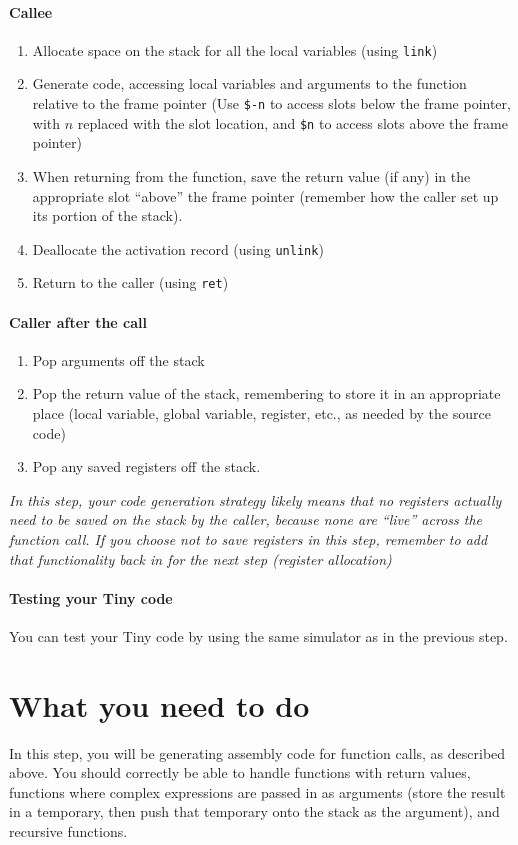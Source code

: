 \documentclass{article}
\begin{document}
\paragraph{Callee}
\begin{enumerate}
	\item Allocate space on the stack for all the local variables (using \texttt{link})
	\item Generate code, accessing local variables and arguments to the function relative to the frame pointer (Use \texttt{\$-n} to access slots below the frame pointer, with $n$ replaced with the slot location, and \texttt{\$n} to access slots above the frame pointer)
	\item When returning from the function, save the return value (if any) in the appropriate slot ``above'' the frame pointer (remember how the caller set up its portion of the stack).
	\item Deallocate the activation record (using \texttt{unlink})
	\item Return to the caller (using \texttt{ret})
\end{enumerate}

\paragraph{Caller after the call}
\begin{enumerate}
	\item Pop arguments off the stack
	\item Pop the return value of the stack, remembering to store it in an appropriate place (local variable, global variable, register, etc., as needed by the source code)
	\item Pop any saved registers off the stack.
\end{enumerate}

{\em In this step, your code generation strategy likely means that no registers actually need to be saved on the stack by the caller, because none are ``live'' across the function call. If you choose not to save registers in this step, remember to add that functionality back in for the next step (register allocation) }

\paragraph{Testing your Tiny code}
You can test your Tiny code by using the same simulator as in the previous step.

\section{What you need to do}
In this step, you will be generating assembly code for function calls, as described above. You should correctly be able to handle functions with return values, functions where complex expressions are passed in as arguments (store the result in a temporary, then push that temporary onto the stack as the argument), and recursive functions.
\end{document}
